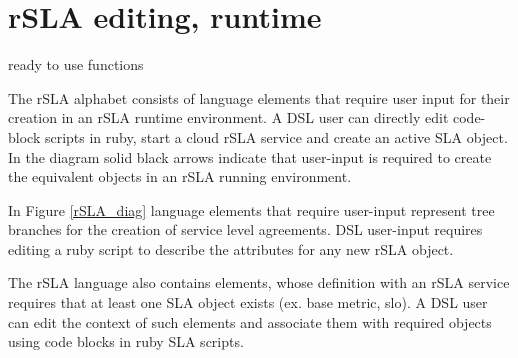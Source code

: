 \section{rSLA editing, runtime}
\label{sec:runtime}
ready to use functions

The rSLA alphabet consists of language elements that require user input for their creation in an rSLA runtime environment. A DSL user can directly 
edit code-block scripts in ruby, start a cloud rSLA service and create an active SLA object. In the diagram solid black arrows indicate that 
user-input is required to create the equivalent objects in an rSLA running environment. 

In Figure \ref{rSLA_diag} language elements that require user-input represent tree branches for the creation of service level agreements. DSL 
user-input requires editing a ruby script to describe the attributes for any new rSLA object. 

The rSLA language also contains elements, whose definition with an rSLA service requires that at least one SLA object exists (ex. base metric, slo). A 
DSL user can edit the context of such elements and associate them with required objects using code blocks in ruby SLA scripts.
